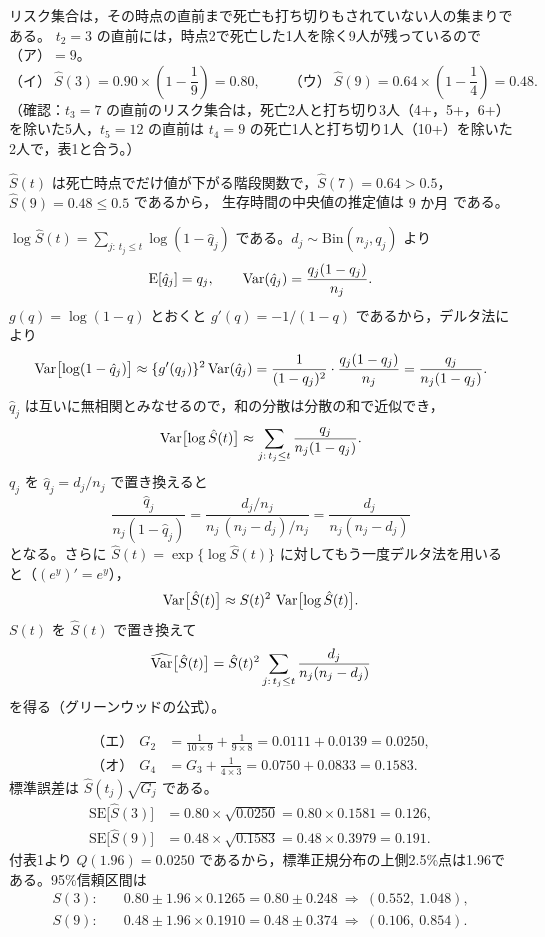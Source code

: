\documentclass[a4paper,11pt]{ltjsarticle}
\begin{document}
\setlength{\abovedisplayskip}{6pt plus 2pt minus 2pt}
\setlength{\belowdisplayskip}{6pt plus 2pt minus 2pt}

リスク集合は，その時点の直前まで死亡も打ち切りもされていない人の集まりである。
$t_2=3$ の直前には，時点2で死亡した1人を除く9人が残っているので（ア）$=\boxed{9}$。
\[
\text{（イ）}\ \hat S(3)=0.90\times\left(1-\frac19\right)=\boxed{0.80},\qquad
\text{（ウ）}\ \hat S(9)=0.64\times\left(1-\frac14\right)=\boxed{0.48}.
\]
（確認：$t_3=7$ の直前のリスク集合は，死亡2人と打ち切り3人（4+，5+，6+）を除いた5人，$t_5=12$ の直前は $t_4=9$ の死亡1人と打ち切り1人（10+）を除いた2人で，表1と合う。）

$\hat S(t)$ は死亡時点でだけ値が下がる階段関数で，$\hat S(7)=0.64>0.5$，$\hat S(9)=0.48\le0.5$ であるから，
生存時間の中央値の推定値は $\boxed{9\text{ か月}}$ である。

$\log\hat S(t)=\sum_{j:\,t_j\le t}\log(1-\hat q_j)$ である。$d_j\sim\mathrm{Bin}(n_j,q_j)$ より
\[
\operatorname{E}[\hat q_j]=q_j,\qquad \operatorname{Var}(\hat q_j)=\frac{q_j(1-q_j)}{n_j}.
\]
$g(q)=\log(1-q)$ とおくと $g'(q)=-1/(1-q)$ であるから，デルタ法により
\[
\operatorname{Var}\bigl[\log(1-\hat q_j)\bigr]\approx\{g'(q_j)\}^2\operatorname{Var}(\hat q_j)=\frac{1}{(1-q_j)^2}\cdot\frac{q_j(1-q_j)}{n_j}=\frac{q_j}{n_j(1-q_j)}.
\]
$\hat q_j$ は互いに無相関とみなせるので，和の分散は分散の和で近似でき，
\[
\operatorname{Var}\bigl[\log\hat S(t)\bigr]\approx\sum_{j:\,t_j\le t}\frac{q_j}{n_j(1-q_j)}.
\]
$q_j$ を $\hat q_j=d_j/n_j$ で置き換えると
\[
\frac{\hat q_j}{n_j(1-\hat q_j)}=\frac{d_j/n_j}{n_j\,(n_j-d_j)/n_j}=\frac{d_j}{n_j(n_j-d_j)}
\]
となる。さらに $\hat S(t)=\exp\{\log\hat S(t)\}$ に対してもう一度デルタ法を用いると（$(e^y)'=e^y$），
\[
\operatorname{Var}\bigl[\hat S(t)\bigr]\approx S(t)^2\,\operatorname{Var}\bigl[\log\hat S(t)\bigr].
\]
$S(t)$ を $\hat S(t)$ で置き換えて
\[
\widehat{\operatorname{Var}}\bigl[\hat S(t)\bigr]=\hat S(t)^2\sum_{j:\,t_j\le t}\frac{d_j}{n_j(n_j-d_j)}
\]
を得る（グリーンウッドの公式）。

\begin{align*}
\text{（エ）}\ \ G_2&=\frac{1}{10\times9}+\frac{1}{9\times8}=0.0111+0.0139=\boxed{0.0250},\\
\text{（オ）}\ \ G_4&=G_3+\frac{1}{4\times3}=0.0750+0.0833=\boxed{0.1583}.
\end{align*}
標準誤差は $\hat S(t_j)\sqrt{G_j}$ である。
\begin{align*}
\mathrm{SE}\bigl[\hat S(3)\bigr]&=0.80\times\sqrt{0.0250}=0.80\times0.1581=\boxed{0.126},\\
\mathrm{SE}\bigl[\hat S(9)\bigr]&=0.48\times\sqrt{0.1583}=0.48\times0.3979=\boxed{0.191}.
\end{align*}
付表1より $Q(1.96)=0.0250$ であるから，標準正規分布の上側2.5\%点は1.96である。95\%信頼区間は
\begin{align*}
S(3):&\quad 0.80\pm1.96\times0.1265=0.80\pm0.248\ \Longrightarrow\ \boxed{(0.552,\ 1.048)},\\
S(9):&\quad 0.48\pm1.96\times0.1910=0.48\pm0.374\ \Longrightarrow\ \boxed{(0.106,\ 0.854)}.
\end{align*}
\end{document}
